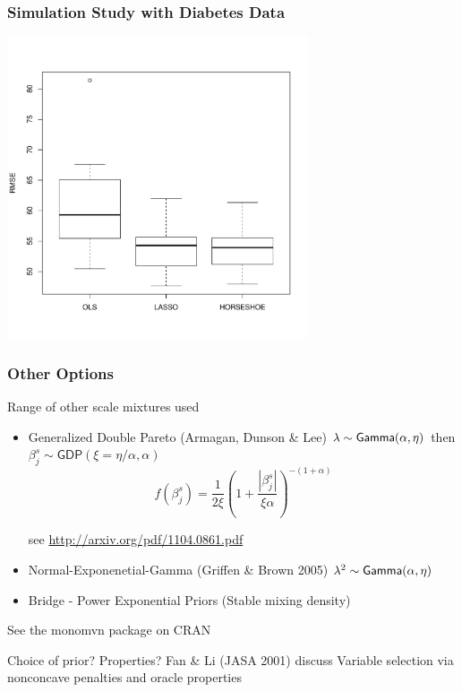 \documentclass[]{beamer}
\begin{document}
\begin{frame}
  \frametitle{Simulation Study with Diabetes Data}
  \includegraphics[height=3.5in]{diabetes}
 
  
\end{frame}

\begin{frame}
  \frametitle{Other Options}
  Range of other scale mixtures used  \pause
  \begin{itemize}
  \item Generalized Double Pareto (Armagan, Dunson \& Lee)  \pause
$\lambda \sim \textsf{Gamma}(\alpha, \eta)$  then $\beta^s_j \sim \textsf{GDP}(\xi
= \eta/\alpha, \alpha)$  \pause
$$
f(\beta^s_j) = \frac{1}{2 \xi} (1 + \frac{|\beta^s_j|}{\xi \alpha})^{-(1 + \alpha)}
$$

see \url{http://arxiv.org/pdf/1104.0861.pdf} \pause
  \item Normal-Exponenetial-Gamma (Griffen \& Brown 2005)
$\lambda^2 \sim \textsf{Gamma}(\alpha, \eta)$ 
  \pause
  \item Bridge - Power Exponential Priors  (Stable mixing density) \pause

   \end{itemize}
See the monomvn package on CRAN \pause

\vfill

Choice of prior?   Properties?  Fan \& Li (JASA 2001) discuss Variable
selection via nonconcave penalties and oracle properties
\end{frame}
\end{document}
